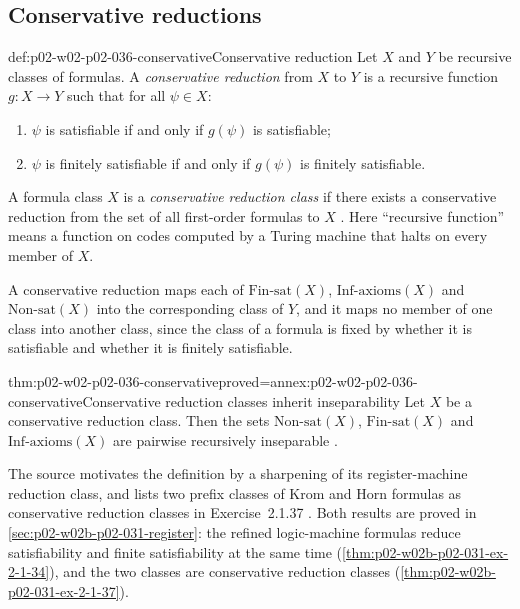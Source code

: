 \subsection{Conservative reductions}
\label{sec:p02-w02-p02-036-conservative}

\begin{hbdefinition}{def:p02-w02-p02-036-conservative}{Conservative reduction}
Let \(X\) and \(Y\) be recursive classes of formulas.  A \emph{conservative
reduction} from \(X\) to \(Y\) is a recursive function \(g:X\to Y\) such that
for all \(\psi\in X\):
\begin{enumerate}
\item \(\psi\) is satisfiable if and only if \(g(\psi)\) is satisfiable;
\item \(\psi\) is finitely satisfiable if and only if \(g(\psi)\) is finitely
      satisfiable.
\end{enumerate}
A formula class \(X\) is a \emph{conservative reduction class} if there exists
a conservative reduction from the set of all first-order formulas to \(X\)
\cite[Sect.~2.1.2, Def.~2.1.35]{BorgerGradelGurevich1997}.  Here ``recursive
function'' means a function on codes computed by a Turing machine that halts
on every member of \(X\).
\end{hbdefinition}

A conservative reduction maps each of \(\mathrm{Fin\text{-}sat}(X)\),
\(\mathrm{Inf\text{-}axioms}(X)\) and \(\mathrm{Non\text{-}sat}(X)\) into the
corresponding class of \(Y\), and it maps no member of one class into another
class, since the class of a formula is fixed by whether it is satisfiable and
whether it is finitely satisfiable.

\begin{hbtheorem}{thm:p02-w02-p02-036-conservative}{proved=annex:p02-w02-p02-036-conservative}{Conservative reduction classes inherit inseparability}
Let \(X\) be a conservative reduction class.  Then the sets
\(\mathrm{Non\text{-}sat}(X)\), \(\mathrm{Fin\text{-}sat}(X)\) and
\(\mathrm{Inf\text{-}axioms}(X)\) are pairwise recursively inseparable
\cite[Sect.~2.1.2, Exercise~2.1.36]{BorgerGradelGurevich1997}.
\end{hbtheorem}

The source motivates the definition by a sharpening of its register-machine
reduction class, and lists two prefix classes of Krom and Horn formulas as
conservative reduction classes in Exercise~2.1.37
\cite[Sect.~2.1.2, pp.~36--37]{BorgerGradelGurevich1997}.  Both results are
proved in \cref{sec:p02-w02b-p02-031-register}: the refined logic-machine
formulas reduce satisfiability and finite satisfiability at the same time
(\cref{thm:p02-w02b-p02-031-ex-2-1-34}), and the two classes are conservative
reduction classes (\cref{thm:p02-w02b-p02-031-ex-2-1-37}).

